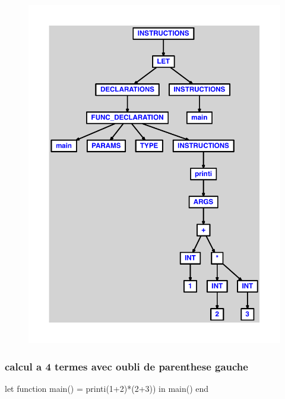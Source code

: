 \documentclass{article}
\begin{document}
\begin{figure}[H]\centering\includegraphics[max width=\textwidth]{ast/ast_30.pdf}\end{figure}\subsubsection{calcul a 4 termes avec oubli de parenthese gauche}
\begin{verbatimtab}
let function main() = printi(1+2)*(2+3)) in main() end
\end{verbatimtab}
\end{document}

